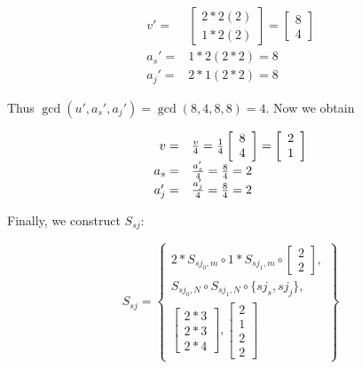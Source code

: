 \begin{displaymath}
\begin{array}{rl}
v' = & \left[
\begin{array}{c}
2 * 2 (2)\\
1 * 2 (2)
\end{array}
\right] = \left[
\begin{array}{c}
8 \\ 4
\end{array}
\right] \\
a_s' = & 1 * 2 (2 * 2) = 8 \\
a_j' = & 2 * 1 (2 * 2) = 8
\end{array}
\end{displaymath}

Thus $\gcd(u', a_s', a_j') = \gcd(8,4,8,8) = 4$.  Now we obtain

\begin{displaymath}
\begin{array}{rl}
v = & {v \over 4} = {1 \over 4} \left[
\begin{array}{c}
8 \\ 4
\end{array}
\right] =  \left[
\begin{array}{c}
2 \\ 1
\end{array}
\right]\\
a_s = & {a_s' \over 4} = {8 \over 4} = 2 \\
a_j' = & {a_j' \over 4} = {8 \over 4} = 2
\end{array}
\end{displaymath}

Finally, we construct $S_{sj}$:

\begin{displaymath}
S_{sj} = \left\{
\begin{array}{c}
2 * S_{sj_0, m} \circ 1 * S_{sj_1, m} \circ \left[\begin{array}{c}2\\2\end{array}\right], \\
S_{sj_0, N} \circ S_{sj_1, N} \circ \{sj_s, sj_j\}, \\
\left[
\begin{array}{c}
2 * 3 \\ 2 * 3 \\ 2 * 4
\end{array}
\right], \left[
\begin{array}{c}
2 \\ 1 \\ 2 \\ 2
\end{array}\right]
\end{array} \right\}
\end{displaymath}

